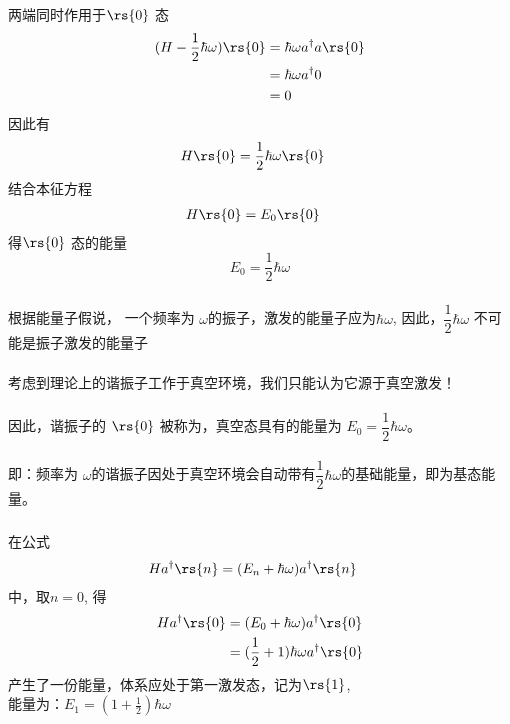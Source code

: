 \begin{frame}[label=current]
  \frametitle{}
两端同时作用于$ \rs{0}  $ 态
\[ 
\begin{aligned}
(H-\frac{1}{2}\hbar \omega) \rs{0} &= \hbar \omega a ^\dagger a \rs{0} \\
&= \hbar \omega a ^\dagger 0 \\
&= 0 \\ 
\end{aligned}
\] 
因此有
\[ 
\begin{aligned} 
H \rs{0} &= \frac{1}{2}\hbar \omega \rs{0}
\end{aligned}
\] 
结合本征方程
\[ 
  \begin{aligned} 
  H \rs{0} &= E_0 \rs{0}
  \end{aligned}
  \] 
得$ \rs{0}  $ 态的能量
\[ \boxed{E_0=\dfrac{1}{2}\hbar \omega} \]
\end{frame}

\begin{frame}[label=current]
  \frametitle{}
  根据能量子假说， 一个频率为 $\omega$的振子，激发的能量子应为$\hbar \omega$, 因此，$ \dfrac{1}{2}\hbar \omega $ 不可能是振子激发的能量子\\
  ~~\\ 
  考虑到理论上的谐振子工作于真空环境，我们只能认为它源于真空激发！\\ 
  ~~\\ 
  因此，谐振子的 $\rs{0}$ 被称为\emf[真空态]，真空态具有的能量为 $ E_0 =\dfrac{1}{2}\hbar \omega $。\\
  ~~\\
  即：频率为 $\omega$的谐振子因处于真空环境会自动带有$\dfrac{1}{2}\hbar \omega$的基础能量，即为基态能量。
\end{frame} 

\begin{frame}[label=current]
  \frametitle{}
\解 在公式 
  \[ 
    \begin{aligned}
      H a^\dagger \rs{n}  
          &=  (E_n +  \hbar \omega ) a^\dagger \rs{n} 
    \end{aligned}
    \]
    中，取$n=0$, 得 
\[ 
    \begin{aligned}
      H a^\dagger \rs{0}  
          &=  (E_0 +  \hbar \omega ) a^\dagger \rs{0} \\
          &=  (\frac{1}{2} + 1 )\hbar \omega a^\dagger \rs{0} 
    \end{aligned}
    \]
    产生了一份能量，体系应处于第一激发态，记为$ \rs{1} $, \\ 能量为：$E_{1} = (1+\frac{1}{2}  )\hbar \omega $  
\end{frame} 

